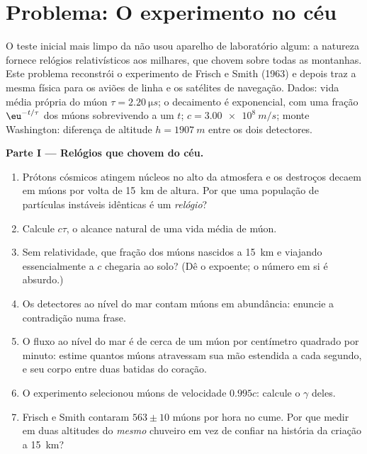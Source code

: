 \section{Problema: O experimento no céu}

\begin{problem}\label{pb:b3:relativistic-kinematics:1}
O teste inicial mais limpo da  não usou aparelho de
laboratório algum: a natureza fornece relógios relativísticos aos
milhares, que chovem sobre todas as montanhas. Este problema
reconstrói o experimento de Frisch e Smith (1963) e depois traz a mesma
física para os aviões de linha e os satélites de navegação. Dados: vida
média própria do múon $\tau =
\qty{2.20}{\micro s}$; o decaimento é exponencial, com uma fração
$\eu^{-t/\tau}$ dos múons sobrevivendo a um  $t$; $c =
\qty{3.00e8}{m/s}$; monte Washington: diferença de altitude $h =
\qty{1907}{m}$ entre os dois detectores.

\medskip\noindent\textbf{Parte I --- Relógios que chovem do céu.}
\begin{enumerate}
  \item Prótons cósmicos atingem núcleos no alto da atmosfera e os
        destroços decaem em múons por volta de \qty{15}{km} de
        altura. Por que uma população de partículas instáveis
        idênticas é um \emph{relógio}?
  \item Calcule $c\tau$, o alcance natural de uma vida média de múon.
  \item Sem relatividade, que fração dos múons nascidos a
        \qty{15}{km} e viajando essencialmente a $c$ chegaria ao
        solo? (Dê o expoente; o número em si é absurdo.)
  \item Os detectores ao nível do mar contam múons em abundância:
        enuncie a contradição numa frase.
  \item O fluxo ao nível do mar é de cerca de um múon por centímetro
        quadrado por minuto: estime quantos múons atravessam sua mão
        estendida a cada segundo, e seu corpo entre duas batidas do
        coração.
  \item O experimento selecionou múons de velocidade $0.995c$:
        calcule o $\gamma$ deles.
  \item Frisch e Smith contaram $563 \pm 10$ múons por hora no cume.
        Por que medir em duas altitudes do \emph{mesmo} chuveiro em
        vez de confiar na história da criação a \qty{15}{km}?
\end{enumerate}


\end{problem}
